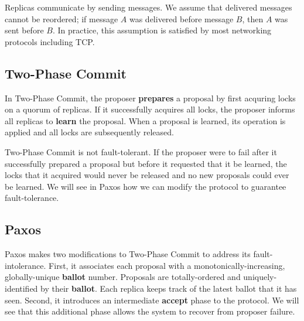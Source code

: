 \documentclass[../main.tex]{subfiles}
\begin{document}
  Replicas communicate by sending messages. We assume that delivered messages cannot be reordered;
  if message $A$ was delivered before message $B$, then $A$ was sent before $B$. In practice, this
  assumption is satisfied by most networking protocols including TCP.

  \subsection{Two-Phase Commit}
  In Two-Phase Commit, the proposer \textbf{prepares} a proposal by first acquring locks on a quorum
  of replicas. If it successfully acquires all locks, the proposer informs all replicas to
  \textbf{learn} the proposal. When a proposal is learned, its operation is applied and all locks are
  subsequently released.

  Two-Phase Commit is not fault-tolerant. If the proposer were to fail after it successfully
  prepared a proposal but before it requested that it be learned, the locks that it acquired would
  never be released and no new proposals could ever be learned. We will see in Paxos how we can
  modify the protocol to guarantee fault-tolerance.

  \subsection{Paxos}
  Paxos makes two modifications to Two-Phase Commit to address its fault-intolerance. First, it
  associates each proposal with a monotonically-increasing, globally-unique \textbf{ballot} number.
  Proposals are totally-ordered and uniquely-identified by their \textbf{ballot}. Each replica
  keeps track of the latest ballot that it has seen. Second, it introduces an intermediate
  \textbf{accept} phase to the protocol. We will see that this additional phase allows the system to
  recover from proposer failure.~\cite{paxos}
\end{document}
